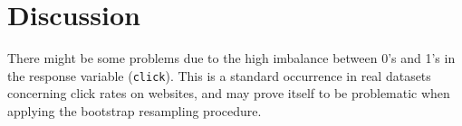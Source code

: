 \documentclass{article}
\begin{document}
\section{Discussion}
There might be some problems due to the high imbalance between 0's and 1's in the response variable (\texttt{click}).
This is a standard occurrence in real datasets concerning click rates on websites, and may prove itself to be problematic when applying the bootstrap resampling procedure.




\printbibliography
\end{document}

